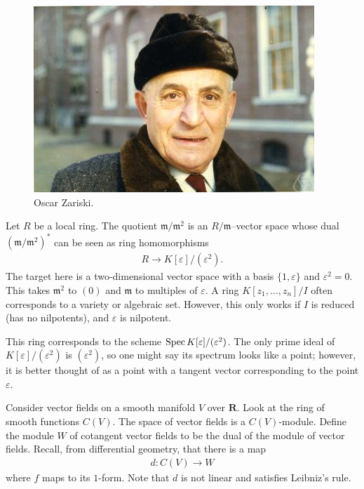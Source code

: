 \documentclass [11 pt, oneside] {article}
\begin{document}
\begin{figure}
\begin{center}
\includegraphics[scale=0.8]{images/zariski}
\caption{Oscar Zariski.}
\end{center}
\end{figure}


Let $R$ be a local ring. The quotient $\mathfrak{m}/\mathfrak{m}^2$ is an $R/\mathfrak{m}$--vector space whose dual $(\mathfrak{m}/\mathfrak{m}^2) ^*$ can be seen as ring homomorphisms 
\begin{align*}
	R\longrightarrow K[\varepsilon]/(\varepsilon^2).
\end{align*}
The target here is a two-dimensional vector space with a basis $\{1,\varepsilon\}$ and $\varepsilon^2=0$. This takes $\mathfrak{m}^2$ to $(0)$ and $\mathfrak{m}$ to multiples of $\varepsilon$. A ring $K[z_1,\hdots, z_n]/I$ often corresponds to a variety or algebraic set. However, this only works if $I$ is reduced (has no nilpotents), and $\varepsilon$ is nilpotent. 

This ring corresponds to the scheme $\operatorname{Spec} K[\varepsilon]/(\varepsilon^2)$. The only prime ideal of $K[\varepsilon]/(\varepsilon^2)$ is $(\varepsilon^2)$, so one might say its spectrum looks like a point; however, it is better thought of as a point with a tangent vector corresponding to the point $\varepsilon$.

Consider vector fields on a smooth manifold $V$ over $\mathbf{R}$. Look at the ring of smooth functions $C(V)$. The space of vector fields is a $C(V)$-module. Define the module $W$ of cotangent vector fields to be the dual of the module of vector fields. Recall, from differential geometry, that there is a map
\begin{align*}
	d:C(V) \longrightarrow W
\end{align*}
where $f$ maps to its $1$-form. Note that $d$ is not linear and satisfies Leibniz's rule. 
\end{document}
